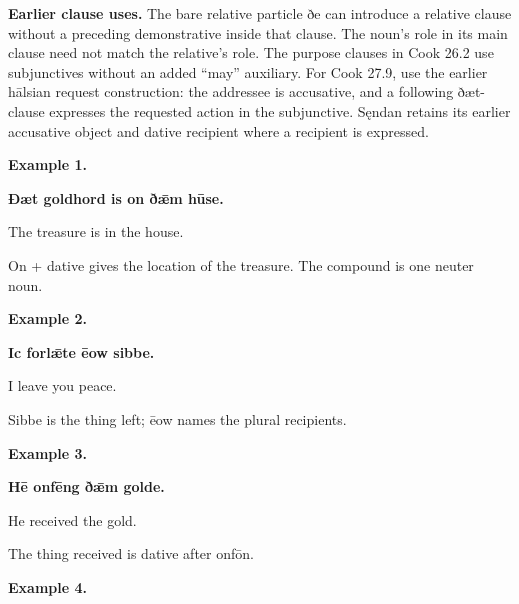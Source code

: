\textbf{Earlier clause uses.} The bare relative particle ðe can introduce a relative clause without a preceding demonstrative inside that clause. The noun’s role in its main clause need not match the relative’s role. The purpose clauses in Cook 26.2 use subjunctives without an added “may” auxiliary. For Cook 27.9, use the earlier hālsian request construction: the addressee is accusative, and a following ðæt-clause expresses the requested action in the subjunctive. Sęndan retains its earlier accusative object and dative recipient where a recipient is expressed.

\textbf{Example 1.}

\textbf{Ðæt goldhord is on ðǣm hūse.}

The treasure is in the house.

On + dative gives the location of the treasure. The compound is one neuter noun.

\textbf{Example 2.}

\textbf{Ic forlǣte ēow sibbe.}

I leave you peace.

Sibbe is the thing left; ēow names the plural recipients.

\textbf{Example 3.}

\textbf{Hē onfēng ðǣm golde.}

He received the gold.

The thing received is dative after onfōn.

\textbf{Example 4.}

